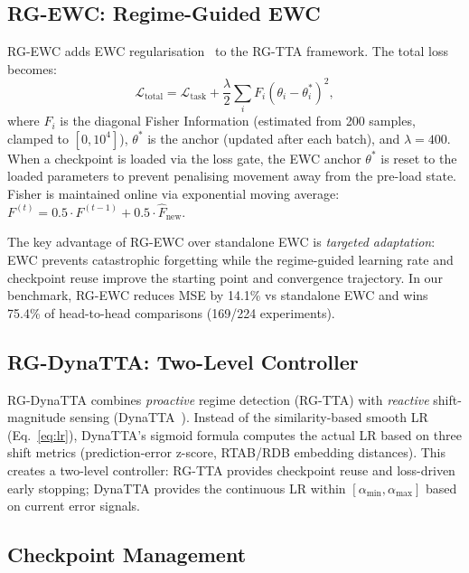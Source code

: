 \documentclass[11pt,a4paper]{article}
\begin{document}
\subsection{RG-EWC: Regime-Guided EWC}
\label{sec:rg_ewc}

RG-EWC adds EWC regularisation~\citep{kirkpatrick2017ewc} to the RG-TTA framework. The total loss becomes:
\begin{equation}
  \mathcal{L}_{\text{total}} = \mathcal{L}_{\text{task}} + \frac{\lambda}{2} \sum_i F_i (\theta_i - \theta^*_i)^2,
  \label{eq:ewc}
\end{equation}
where $F_i$ is the diagonal Fisher Information (estimated from 200 samples, clamped to $[0, 10^4]$), $\theta^*$ is the anchor (updated after each batch), and $\lambda = 400$. When a checkpoint is loaded via the loss gate, the EWC anchor $\theta^*$ is reset to the loaded parameters to prevent penalising movement away from the pre-load state. Fisher is maintained online via exponential moving average: $F^{(t)} = 0.5 \cdot F^{(t-1)} + 0.5 \cdot \hat{F}_{\text{new}}$.

The key advantage of RG-EWC over standalone EWC is \emph{targeted adaptation}: EWC prevents catastrophic forgetting while the regime-guided learning rate and checkpoint reuse improve the starting point and convergence trajectory. In our benchmark, RG-EWC reduces MSE by 14.1\% vs standalone EWC and wins 75.4\% of head-to-head comparisons (169/224 experiments).

\subsection{RG-DynaTTA: Two-Level Controller}
\label{sec:rg_dynatta}

RG-DynaTTA combines \emph{proactive} regime detection (RG-TTA) with \emph{reactive} shift-magnitude sensing (DynaTTA~\citep{grover2025dynatta}). Instead of the similarity-based smooth LR (Eq.~\ref{eq:lr}), DynaTTA's sigmoid formula computes the actual LR based on three shift metrics (prediction-error z-score, RTAB/RDB embedding distances). This creates a two-level controller: RG-TTA provides checkpoint reuse and loss-driven early stopping; DynaTTA provides the continuous LR within $[\alpha_{\min}, \alpha_{\max}]$ based on current error signals.

\subsection{Checkpoint Management}
\label{sec:checkpoints}
\end{document}
